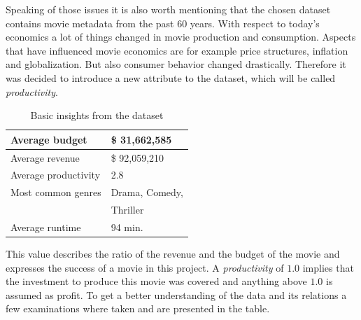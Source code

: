 Speaking of those issues it is also worth mentioning that the chosen dataset contains movie metadata from the past 60 years. With respect to today's economics a lot of things changed in movie production and consumption. Aspects that have influenced movie economics are for example price structures, inflation and globalization. But also consumer behavior changed drastically. Therefore it was decided to introduce a new attribute to the dataset, which will be called \textit{productivity}. 
\begin{table}
	\begin{tabular}{| l | l |}
	\hline
	Average budget & \$ 31,662,585 \\ \hline
	Average revenue & \$ 92,059,210 \\ \hline
	Average productivity & 2.8 \\ \hline
	Most common genres & Drama, Comedy,\\ & Thriller \\ \hline
	Average runtime & 94 min. \\ \hline
	\end{tabular}
	\caption{Basic insights from the dataset}
\end{table} 
This value describes the ratio of the revenue and the budget of the movie and expresses the success of a movie in this project. A \textit{productivity} of $1.0$ implies that the investment to produce this movie was covered and anything above $1.0$ is assumed as profit.
To get a better understanding of the data and its relations a few examinations where taken and are presented in the table.
